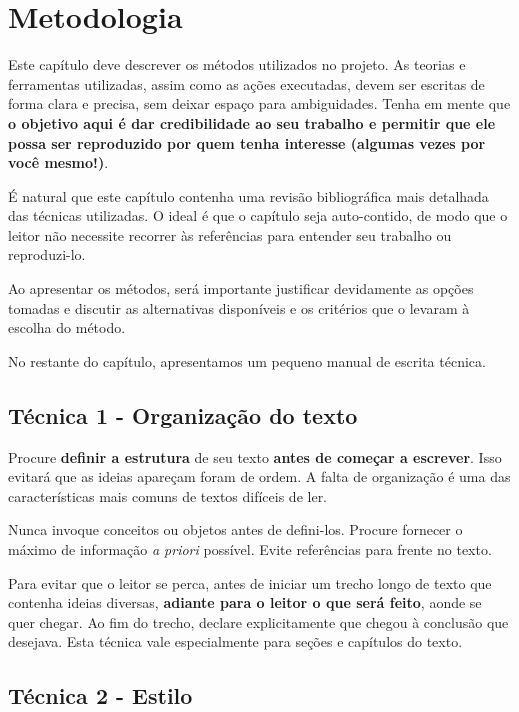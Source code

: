 \chapter{Metodologia}
\label{chap:metodologia}

Este capítulo deve descrever os métodos utilizados no projeto. As teorias e ferramentas utilizadas, assim como as ações executadas, devem ser escritas de forma clara e precisa, sem deixar espaço para ambiguidades. Tenha em mente que \textbf{o objetivo aqui é dar credibilidade ao seu trabalho e permitir que ele possa ser reproduzido por quem tenha interesse (algumas vezes por você mesmo!)}. 

É natural que este capítulo contenha uma revisão bibliográfica mais detalhada das técnicas utilizadas. O ideal é que o capítulo seja auto-contido, de modo que o leitor não necessite recorrer às referências para entender seu trabalho ou reproduzi-lo.

Ao apresentar os métodos, será importante justificar devidamente as opções tomadas e discutir as alternativas disponíveis e os critérios que o levaram à escolha do método.

No restante do capítulo, apresentamos um pequeno manual de escrita técnica.

\section{Técnica 1 - Organização do texto}
\label{sec:metodo1}

Procure \textbf{definir a estrutura} de seu texto \textbf{antes de começar a escrever}. Isso evitará que as ideias apareçam foram de ordem. A falta de organização é uma das características mais comuns de textos difíceis de ler.

Nunca invoque conceitos ou objetos antes de defini-los. Procure fornecer o máximo de informação \emph{a priori} possível. Evite referências para frente no texto. 

Para evitar que o leitor se perca, antes de iniciar um trecho longo de texto que contenha ideias diversas, \textbf{adiante para o leitor o que será feito}, aonde se quer chegar. Ao fim do trecho, declare explicitamente que chegou à conclusão que desejava. Esta técnica vale especialmente para seções e capítulos do texto. 

\section{Técnica 2 - Estilo}
\label{sec:estilo}

